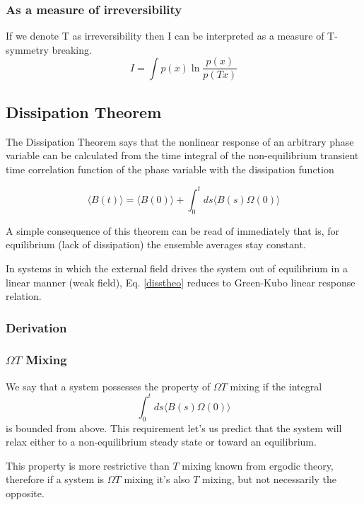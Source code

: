\documentclass[a4paper,12pt,nofootinbib]{article}
\begin{document}
\subsubsection{As a measure of irreversibility}
If we denote T as irreversibility then I can be interpreted as a measure of T-symmetry breaking.
\begin{displaymath}
  I =\int p(x) \ln{\frac{p( x)}{p(T x)}}
\end{displaymath}


\subsection{Dissipation Theorem}
The Dissipation Theorem says that the nonlinear response of an arbitrary phase variable can be calculated from the time integral of the non-equilibrium transient time correlation function of the phase variable with the dissipation function


\begin{equation}
\langle B(t)\rangle =\langle B(0) \rangle +\int_0^t ds \langle B(s) \Omega(0) \rangle \label{disstheo}
\end{equation}

A simple consequence of this theorem can be read of immediately that is, for equilibrium (lack of dissipation) the ensemble averages stay constant.

In systems in which the external field drives the system out of equilibrium in a linear manner (weak field), Eq. \ref{disstheo} reduces to Green-Kubo linear response relation.

\subsubsection{Derivation}

\subsubsection{$\Omega T$ Mixing}

We say that a system possesses the property of $\Omega T$ mixing if the integral
\begin{equation}
  \int_0^t ds \langle B(s) \Omega(0) \rangle
\end{equation}
is bounded from above. This requirement let's us predict that the system will relax either to a non-equilibrium steady state or toward an equilibrium.

This property is more restrictive than $T$ mixing known from ergodic theory, therefore if a system is $\Omega T$ mixing it's also $T$ mixing, but not necessarily the opposite.
\end{document}
